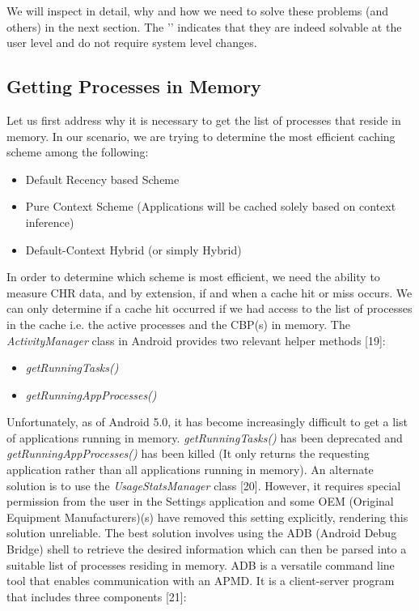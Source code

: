 \documentclass[12pt]{uthesis-v12}  %
\begin{document}
			We will inspect in detail, why and how we need to solve these problems (and others) in the next section. The  '\checkmark' indicates that they are indeed solvable at the user level and do not require system level changes.
			
		\subsection{Getting Processes in Memory}
			Let us first address why it is necessary to get the list of processes that reside in memory. In our scenario, we are trying to determine the most efficient caching scheme among the following:
			
			\begin{itemize}
				\item Default Recency based Scheme
				\item Pure Context Scheme (Applications will be cached solely based on context inference)
				\item Default-Context Hybrid (or simply Hybrid)
			\end{itemize}
			
			In order to determine which scheme is most efficient, we need the ability to measure CHR data, and by extension, if and when a cache hit or miss occurs. We can only determine if a cache hit occurred if we had access to the list of processes in the cache i.e. the active processes and the CBP(s) in memory. The {\em ActivityManager} class in Android provides two relevant helper methods [19]:
			
			\begin{itemize}
				\item {\em getRunningTasks()}
				\item {\em getRunningAppProcesses()}
			\end{itemize} 
			
			Unfortunately, as of Android 5.0, it has become increasingly difficult to get a list of applications running in memory. {\em getRunningTasks()} has been deprecated and {\em getRunningAppProcesses()} has been killed (It only returns the requesting application rather than all applications running in memory). An alternate solution is to use the {\em UsageStatsManager} class [20]. However, it requires special permission from the user in the Settings application and some OEM (Original Equipment Manufacturers)(s) have removed this setting explicitly, rendering this solution unreliable. The best solution involves using the ADB (Android Debug Bridge) shell to retrieve the desired information which can then be parsed into a suitable list of processes residing in memory. ADB is a versatile command line tool that enables communication with an APMD. It is a client-server program that includes three components [21]:
			
\end{document}
